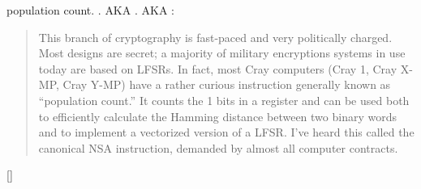   \item[POPCNT] population count. 
  .
  \ac{AKA} .
  \ac{AKA}  :

\begin{framed}
\begin{quotation}
  This branch of cryptography is fast-paced and very politically charged.
  Most designs are secret; a majority of military encryptions systems in use today are 
  based on LFSRs. 
  In fact, most Cray computers (Cray 1, Cray X-MP, Cray Y-MP) have a rather curious 
  instruction generally known as “population count.” It counts the 1 bits in a register 
  and can be used both to efficiently calculate the Hamming distance between two binary 
  words and to implement a vectorized version of a LFSR. I’ve heard this called the canonical 
  NSA instruction, demanded by almost all computer contracts.
\end{quotation}
\end{framed}
[\Schneier{}]


